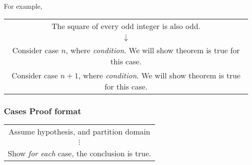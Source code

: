 For example,
\begin{center}
  \begin{tabular}{c}
    The square of every odd integer is also odd.                                             \\
    $\downarrow$                                                                             \\
    Consider case $n$, where \textit{condition}. We will show theorem is true for this case. \\
    Consider case $n+1$, where \textit{condition}. We will show theorem is true for this case.
  \end{tabular}
\end{center}
\subsubsection*{Cases Proof format}
\begin{center}
  \begin{tabular}{|c|}
    \hline
    Assume hypothesis, and partition domain              \\
    $\vdots$                                             \\
    Show \textit{for each} case, the conclusion is true. \\
    \hline
  \end{tabular}
\end{center}